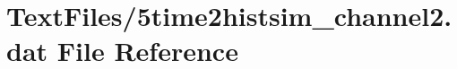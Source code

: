 \hypertarget{5time2histsim__channel2_8dat}{}\section{Text\+Files/5time2histsim\+\_\+channel2.dat File Reference}
\label{5time2histsim__channel2_8dat}
